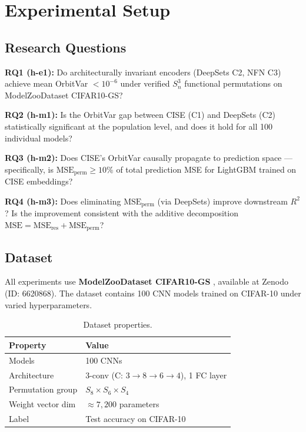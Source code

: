 \section{Experimental Setup}
\label{sec:setup}

\subsection{Research Questions}

\textbf{RQ1 (h-e1):} Do architecturally invariant encoders (DeepSets C2, NFN C3) achieve mean OrbitVar $< 10^{-6}$ under verified $S_n^3$ functional permutations on ModelZooDataset CIFAR10-GS?

\textbf{RQ2 (h-m1):} Is the OrbitVar gap between CISE (C1) and DeepSets (C2) statistically significant at the population level, and does it hold for all 100 individual models?

\textbf{RQ3 (h-m2):} Does CISE's OrbitVar causally propagate to prediction space --- specifically, is $\text{MSE}_\text{perm} \ge 10\%$ of total prediction MSE for LightGBM trained on CISE embeddings?

\textbf{RQ4 (h-m3):} Does eliminating $\text{MSE}_\text{perm}$ (via DeepSets) improve downstream $R^2$? Is the improvement consistent with the additive decomposition $\text{MSE} = \text{MSE}_\text{res} + \text{MSE}_\text{perm}$?

\subsection{Dataset}

All experiments use \textbf{ModelZooDataset CIFAR10-GS} \cite{Unterthiner2020Predicting,Schurholt2022Model}, available at Zenodo (ID: 6620868). The dataset contains 100 CNN models trained on CIFAR-10 under varied hyperparameters.

\begin{table}[h]
\centering
\caption{Dataset properties.}
\label{tab:dataset}
\begin{tabular}{ll}
\toprule
Property & Value \\
\midrule
Models & 100 CNNs \\
Architecture & 3-conv (C: $3{\to}8{\to}6{\to}4$), 1 FC layer \\
Permutation group & $S_8 \times S_6 \times S_4$ \\
Weight vector dim & ${\approx}7{,}200$ parameters \\
Label & Test accuracy on CIFAR-10 \\
\bottomrule
\end{tabular}
\end{table}

